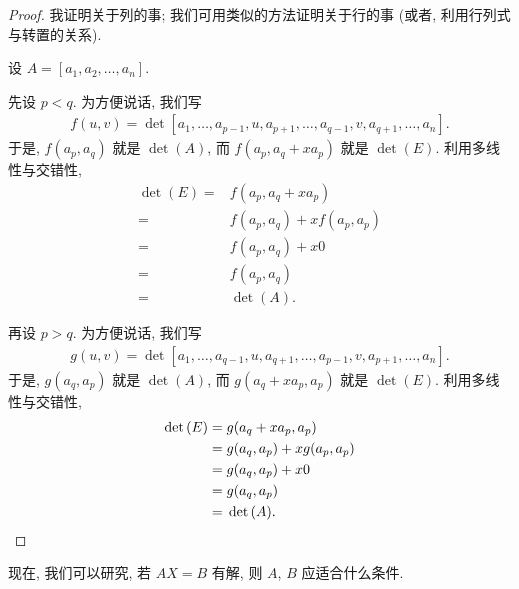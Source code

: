 \begin{proof}
    我证明关于列的事;
    我们可用类似的方法证明关于行的事
    (或者, 利用行列式与转置的关系).

    设 \(A = [a_1, a_2, \dots, a_n]\).

    先设 \(p < q\).
    为方便说话, 我们写
    \begin{align*}
        f(u, v)
        = \det {[a_1, \dots, a_{p-1}, u, a_{p+1}, \dots,
                    a_{q-1}, v, a_{q+1}, \dots, a_n]}.
    \end{align*}
    于是, \(f(a_p, a_q)\) 就是 \(\det {(A)}\),
    而 \(f(a_p, a_q + xa_p)\) 就是 \(\det {(E)}\).
    利用多线性与交错性,
    \begin{align*}
        \det {(E)}
        = {} & f(a_p, a_q + xa_p)         \\
        = {} & f(a_p, a_q) + xf(a_p, a_p) \\
        = {} & f(a_p, a_q) + x0           \\
        = {} & f(a_p, a_q)                \\
        = {} & \det {(A)}.
    \end{align*}

    再设 \(p > q\).
    为方便说话, 我们写
    \begin{align*}
        g(u, v)
        = \det {[a_1, \dots, a_{q-1}, u, a_{q+1}, \dots,
                    a_{p-1}, v, a_{p+1}, \dots, a_n]}.
    \end{align*}
    于是, \(g(a_q, a_p)\) 就是 \(\det {(A)}\),
    而 \(g(a_q + xa_p, a_p)\) 就是 \(\det {(E)}\).
    利用多线性与交错性,
    \begin{align*}
        \det {(E)}
        = {} & g(a_q + xa_p, a_p)         \\
        = {} & g(a_q, a_p) + xg(a_p, a_p) \\
        = {} & g(a_q, a_p) + x0           \\
        = {} & g(a_q, a_p)                \\
        = {} & \det {(A)}.
        \qedhere
    \end{align*}
\end{proof}

现在, 我们可以研究,
若 \(AX = B\) 有解,
则 \(A\), \(B\) 应适合什么条件.

